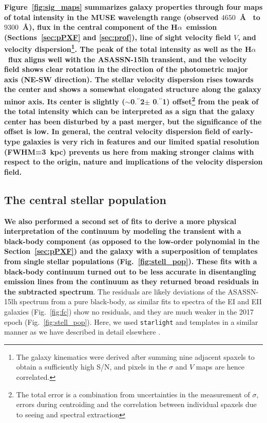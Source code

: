 \documentclass[traditabstract]{aa}
\newcommand{\farc}{\hbox{$.\!\!^{\prime\prime}$}}
\newcommand{\ha}{H$\alpha$}
\begin{document}
\textbf{Figure~\ref{fig:sig_maps} summarizes galaxy properties through four maps of total intensity in the MUSE wavelength range (observed $4650$~\AA~ to $9300$~\AA), flux in the central component of the \ha~emission (Sections~\ref{sec:pPXF} and \ref{sec:prof}), line of sight velocity field $V$, and velocity dispersion\footnote{The galaxy kinematics were derived after summing nine adjacent spaxels to obtain a sufficiently high S/N, and pixels in the $\sigma$ and $V$ maps are hence correlated.}. The peak of the total intensity as well as the \ha~flux aligns well with the ASASSN-15lh transient, and the velocity field shows clear rotation in the direction of the photometric major axis (NE-SW direction). The stellar velocity dispersion rises towards the center and shows a somewhat elongated structure along the galaxy minor axis. Its center is slightly ($\sim$0\farc{2}$\pm$ 0\farc{1}) offset\footnote{The total error is a combination from uncertainties in the measurement of $\sigma$, errors during centroiding and the correlation between individual spaxels due to seeing and spectral extraction} from the peak of the total intensity which can be interpreted as a sign that the galaxy center has been disturbed by a past merger, but the significance of the offset is low. In general, the central velocity dispersion field of early-type galaxies is very rich in features \citep{2004MNRAS.352..721E} and our limited spatial resolution (FWHM=3~kpc) prevents us here from making stronger claims with respect to the origin, nature and implications of the velocity dispersion field.}



\subsection{The central stellar population}
\label{sec:spop}

\textbf{We also performed a second set of fits to derive a more physical interpretation of the continuum by modeling the transient with a black-body component (as opposed to the low-order polynomial in the Section~\ref{sec:pPXF}) and the galaxy with a superposition of templates from single stellar populations (Fig.~\ref{fig:stell_pop}). These fits with a black-body continuum turned out to be less accurate in disentangling emission lines from the continuum as they returned broad residuals in the subtracted spectrum}. The residuals are likely deviations of the ASASSN-15lh spectrum from a pure black-body, as similar fits to spectra of the EI and EII galaxies (Fig.~\ref{fig:fc}) show no residuals, and they are much weaker in the 2017 epoch (Fig.~\ref{fig:stell_pop}). Here, we used \texttt{starlight} \citep{2005MNRAS.358..363C, 2009RMxAC..35..127C} and \citet{2003MNRAS.344.1000B} templates in a similar manner as we have described in detail elsewhere \citep{2016MNRAS.455.4087G, 2017arXiv170205430K}.
\end{document}
